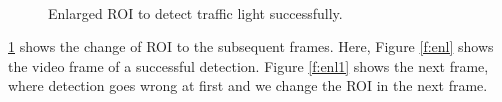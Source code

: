 \begin{figure}[!ht]
\centering
{}\\
\caption{Enlarged ROI to detect traffic light successfully.}
\label{f:rec_enl}
\end{figure}

\ref{f:rec_enl} shows the change of ROI to the subsequent frames.
Here, Figure \ref{f:enl} shows the video frame of a successful detection.
Figure \ref{f:enl1} shows the next frame, where detection goes wrong at first and we change the ROI in the next frame.



